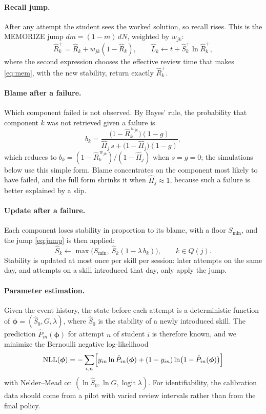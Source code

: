 \documentclass[runningheads]{llncs}
\newcommand{\Rh}{\hat R}
\newcommand{\Sh}{\hat S}
\newcommand{\Lh}{\hat L}
\newcommand{\Pih}{\hat\Pi}
\newcommand{\Smin}{S_{\min}}
\begin{document}
\paragraph{Recall jump.} After any attempt the student sees the worked solution, so recall rises. This is the MEMORIZE jump $dm=(1-m)\,dN$, weighted by $w_{jk}$:
\begin{equation}
\Rh_k^{+}=\Rh_k+w_{jk}(1-\Rh_k),\qquad \Lh_k\leftarrow t+\Sh_k^{+}\ln\Rh_k^{+},
\label{eq:jump}
\end{equation}
where the second expression chooses the effective review time that makes \eqref{eq:mem}, with the new stability, return exactly $\Rh_k^{+}$.

\paragraph{Blame after a failure.} Which component failed is not observed. By Bayes' rule, the probability that component $k$ was not retrieved given a failure is
\begin{equation}
b_k=\frac{\bigl(1-\Rh_k^{\,w_{jk}}\bigr)(1-g)}{\Pih_j\,s+\bigl(1-\Pih_j\bigr)(1-g)},
\label{eq:blame}
\end{equation}
which reduces to $b_k=(1-\Rh_k^{\,w_{jk}})/(1-\Pih_j)$ when $s=g=0$; the simulations below use this simple form. Blame concentrates on the component most likely to have failed, and the full form shrinks it when $\Pih_j\approx1$, because such a failure is better explained by a slip.

\paragraph{Update after a failure.} Each component loses stability in proportion to its blame, with a floor $\Smin$, and the jump \eqref{eq:jump} is then applied:
\begin{equation}
\Sh_k\leftarrow\max\bigl(\Smin,\ \Sh_k(1-\lambda\,b_k)\bigr),\qquad k\in Q(j).
\label{eq:fail}
\end{equation}
Stability is updated at most once per skill per session: later attempts on the same day, and attempts on a skill introduced that day, only apply the jump.

\paragraph{Parameter estimation.} Given the event history, the state before each attempt is a deterministic function of $\bm\phi=(\Sh_0,G,\lambda)$, where $\Sh_0$ is the stability of a newly introduced skill. The prediction $\hat P_{in}(\bm\phi)$ for attempt $n$ of student $i$ is therefore known, and we minimize the Bernoulli negative log-likelihood
\begin{equation}
\mathrm{NLL}(\bm\phi)=-\sum_{i,n}\Bigl[y_{in}\ln\hat P_{in}(\bm\phi)+(1-y_{in})\ln\bigl(1-\hat P_{in}(\bm\phi)\bigr)\Bigr]
\label{eq:nll}
\end{equation}
with Nelder--Mead on $(\ln\Sh_0,\ln G,\operatorname{logit}\lambda)$. For identifiability, the calibration data should come from a pilot with varied review intervals rather than from the final policy.
\end{document}
